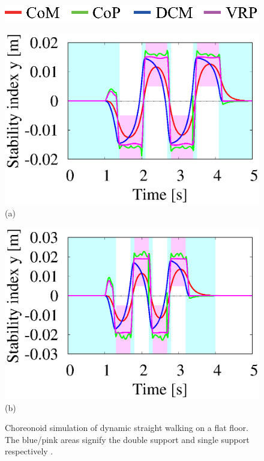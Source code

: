 \documentclass[twocolumn]{jsarticle}
\begin{document}
\begin{figure}[h]
  \begin{minipage}{0.18\hsize}
        \hspace{0.2mm}
      \end{minipage}
\begin{minipage}{0.33\linewidth}
    \centering
    \includegraphics[width=1.0\linewidth]{./fig/key4.eps}
  \end{minipage}
   \begin{minipage}{0.18\hsize}
        \hspace{0.2mm}
      \end{minipage}
  \begin{minipage}{0.48\linewidth}
    \centering
    \includegraphics[width=1.0\linewidth]{./fig/No1.eps}
    \footnotesize{\hspace{30pt}(a)}
  \end{minipage}
  \begin{minipage}{0.48\linewidth}
    \centering
    \includegraphics[width=1.0\linewidth]{./fig/No2.eps}
    \footnotesize{\hspace{30pt}(b)}
  \end{minipage}
  \caption{Choreonoid simulation of dynamic straight walking on a flat floor. The
blue/pink areas signify the double support and single support respectively .}
  \label{fig:CHT9}
\end{figure}
\end{document}
